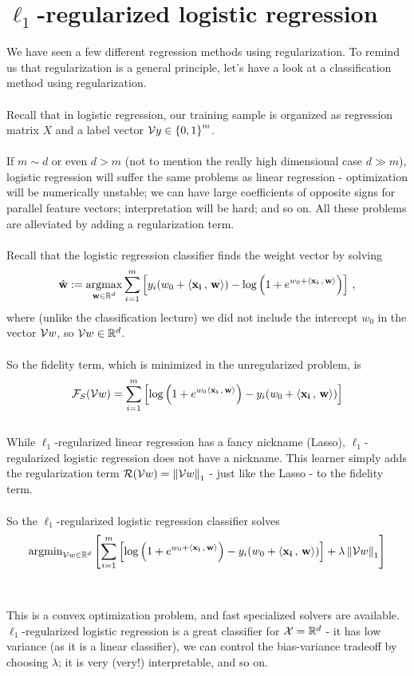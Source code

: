 \section{$\ell_1$-regularized logistic regression}

We have seen a few different regression methods using regularization. To remind
us that regularization is a general principle, let's have a look at a
classification method using regularization. 
\\~\\
Recall that in logistic regression, our training sample 
is organized as regression matrix $X$ and a
label vector $\mathcal{V}{y}\in\left\{ 0,1 \right\}^m$.
\\~\\
If $m\sim d$ or even $d>m$ (not to mention the really high dimensional case
$d\gg m$), logistic regression will  suffer the same problems as linear
regression -  optimization will be numerically unstable; we can have large
coefficients of opposite signs for parallel feature vectors; interpretation will
be hard; and so on. All these problems are alleviated by adding a regularization
term. 
\\~\\
Recall that the logistic regression classifier finds the weight vector by solving
 \[
      \hat{\mathbf{w}} := 
      \operatorname*{argmax}_{\mathbf{w}\in\mathbb{R}^{d}}  
      \sum_{i=1}^m \left[ y_i (w_0+{\left\langle \mathbf{x_i}\,,\,\mathbf{w} \right\rangle}) - \log
      \left(1+e^{w_0+{\left\langle \mathbf{x_i}\,,\,\mathbf{w} \right\rangle}}\right) \right]\,,
    \]
    where (unlike the classification lecture)
    we did not include the intercept $w_0$ in the vector $\mathcal{V}{w}$, so
    $\mathcal{V}{w}\in\mathbb{R}^d$.
\\~\\
    So the fidelity term, which is minimized in the unregularized problem, is  
    \[
      \mathcal{F}_S(\mathcal{V}{w}) = 
       \sum_{i=1}^m \left[\log
      \left(1+e^{w_0{\left\langle \mathbf{x_i}\,,\,\mathbf{w} \right\rangle}}\right) 
-
        y_i (w_0+{\left\langle \mathbf{x_i}\,,\,\mathbf{w} \right\rangle})  \right]   \]
~\\
      While $\ell_1$-regularized linear regression has a fancy nickname (Lasso),
      $\ell_1$-regularized logistic regression does not have a nickname. 
      This learner simply adds the regularization term
      $\mathcal{R}(\mathcal{V}{w})=\left\| \mathcal{V}{w}\right\|_1$ - just like the Lasso - to the fidelity term. 
      \\~\\
      So the $\ell_1$-regularized logistic regression classifier solves
      \[
        \text{argmin}_{\mathcal{V}{w}\in\mathbb{R}^d}
        \left[
        \sum_{i=1}^m \left[\log
      \left(1+e^{w_0+{\left\langle \mathbf{x_i}\,,\,\mathbf{w} \right\rangle}}\right) 
-
        y_i (w_0+{\left\langle \mathbf{x_i}\,,\,\mathbf{w} \right\rangle})  \right]  + \lambda\left\| \mathcal{V}{w}\right\|_1\right] \]
      \\~\\
      This is a convex optimization problem, and fast 
      specialized solvers are
      available. $\ell_1$-regularized logistic regression is a great classifier
      for $\mathcal{X}=\mathbb{R}^d$ - it has low variance (as it is a linear classifier), we can
      control the bias-variance tradeoff by choosing $\lambda$; it is very
      (very!) interpretable, and so on.


